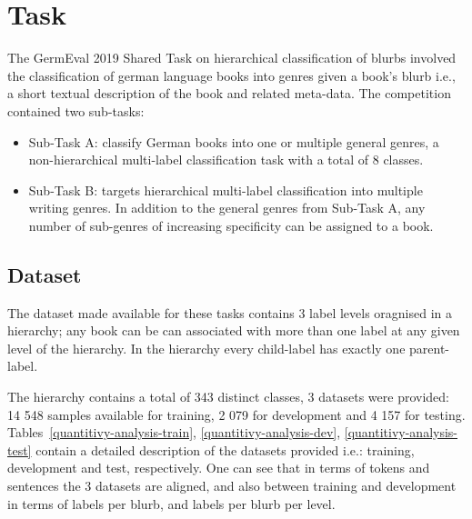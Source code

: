 \documentclass[11pt,a4paper]{article}
\begin{document}
\section{Task}\label{task}

The GermEval 2019 Shared Task on hierarchical classification of blurbs
involved the classification of german language books into genres given a book's blurb i.e., a
short textual description of the book and related meta-data. The competition
contained two sub-tasks:

\begin{itemize}

\item Sub-Task A: classify German books into one or multiple general 
genres, a non-hierarchical multi-label classification task with a total of 8 classes.

\item Sub-Task B: targets hierarchical multi-label classification into multiple
writing genres. In addition to the general genres from Sub-Task A, any number of sub-genres of increasing
specificity can be assigned to a book.

\end{itemize}


\subsection{Dataset}

The dataset made available for these tasks contains 3 label levels oragnised in a hierarchy;
any book can be can associated with more than one label at any given level of the hierarchy.
In the hierarchy every child-label has exactly one parent-label.

The hierarchy contains a total of 343 distinct classes, 3 datasets were
provided: 14 548 samples available for training, 2 079 for development and
4 157 for testing. Tables~\ref{quantitivy-analysis-train}, \ref{quantitivy-analysis-dev},
\ref{quantitivy-analysis-test}  contain a detailed description of
the datasets provided i.e.: training, development and test, respectively. One can
see that in terms of tokens and sentences the 3 datasets are aligned, and also
between training and development in terms of labels per blurb, and labels per blurb
per level.
\end{document}
